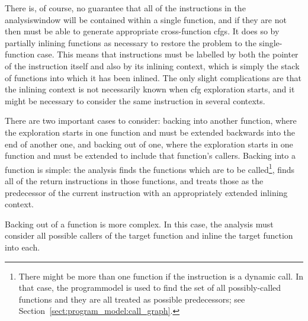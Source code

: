 \label{sect:derive:cross_function_cfgs}


There is, of course, no guarantee that all of the instructions in the
\gls{analysiswindow} will be contained within a single function, and
if they are not then {\technique} must be able to generate appropriate
cross-function \glspl{cfg}.  It does so by partially inlining
functions as necessary to restore the problem to the single-function
case.  This means that instructions must be labelled by both the
pointer of the instruction itself and also by its inlining context,
which is simply the stack of functions into which it has been
inlined.  The only slight complications
are that the inlining context is not necessarily known when \gls{cfg}
exploration starts, and it might be necessary to consider the same
instruction in several contexts.


There are two important cases to consider: backing into another
function, where the exploration starts in one function and must be
extended backwards into the end of another one, and backing out of
one, where the exploration starts in one function and must be extended
to include that function's callers.  Backing into a function is
simple: the analysis finds the functions which are to be
called\footnote{There might be more than one function if the
  instruction is a dynamic call.  In that case, the \gls{programmodel}
  is used to find the set of all possibly-called functions and they
  are all treated as possible predecessors; see
  Section~\ref{sect:program_model:call_graph}.}, finds all of the
return instructions in those functions, and treats those as the
predecessor of the current instruction with an appropriately extended
inlining context.

Backing out of a function is more complex.  In this case, the analysis
must consider all possible callers of the target function and inline
the target function into each.  


